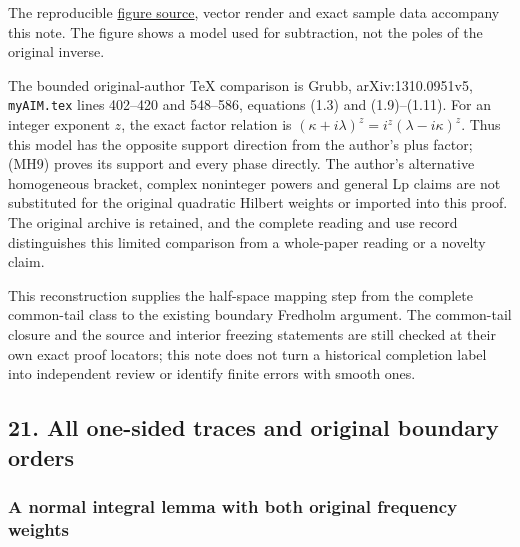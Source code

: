 \documentclass[
  11pt,
]{article}
\makeatletter
\let\ReaderOriginalAnchorStart\hyper@anchorstart
\let\ReaderOriginalAnchorEnd\hyper@anchorend
\let\ReaderPendingAliases\@empty
\def\ReaderArmAliases#1{\gdef\ReaderPendingAliases{#1}}
\def\hyper@anchorstart#1{\ReaderIfNativeAnchorTF{#1}{\ReaderPendingAliases\global\let\ReaderPendingAliases\@empty}{}\ReaderOriginalAnchorStart{#1}}
\makeatother
\begin{document}
The reproducible \href{../figures/mixed_halfspace_mapping_166.py}{figure
source}, vector render and exact sample data accompany this note. The
figure shows a model used for subtraction, not the poles of the original
inverse.

The bounded original-author TeX comparison is Grubb, arXiv:1310.0951v5,
\texttt{myAIM.tex} lines 402--420 and 548--586, equations (1.3) and
(1.9)--(1.11). For an integer exponent \(z\), the exact factor relation
is \((\kappa+i\lambda)^z=i^z(\lambda-i\kappa)^z\). Thus this model has
the opposite support direction from the author's plus factor; (MH9)
proves its support and every phase directly. The author's alternative
homogeneous bracket, complex noninteger powers and general Lp claims are
not substituted for the original quadratic Hilbert weights or imported
into this proof. The original archive is retained, and the complete
reading and use record distinguishes this limited comparison from a
whole-paper reading or a novelty claim.

This reconstruction supplies the half-space mapping step from the
complete common-tail class to the existing boundary Fredholm argument.
The common-tail closure and the source and interior freezing statements
are still checked at their own exact proof locators; this note does not
turn a historical completion label into independent review or identify
finite errors with smooth ones.

\ReaderArmAliases{\ReaderOriginalAnchorStart{AN03-GCF-FOUNDATION-021}\ReaderOriginalAnchorEnd\begingroup\expandafter\def\csname @currentHref\endcsname{AN03-GCF-FOUNDATION-021}\label{AN03-GCF-FOUNDATION-021}\endgroup\ReaderOriginalAnchorStart{boundary-foundation-21}\ReaderOriginalAnchorEnd}
\subsection{21. All one-sided traces and original boundary
orders}\label{boundary-foundation-21}

\subsubsection{A normal integral lemma with both original frequency
weights}\label{a-normal-integral-lemma-with-both-original-frequency-weights}
\end{document}
